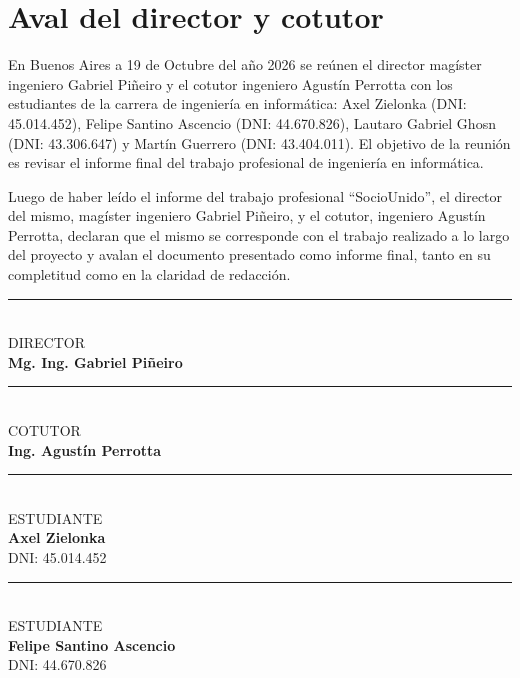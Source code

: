 \section{Aval del director y cotutor}

En Buenos Aires a 19 de Octubre del año 2026 se reúnen el director magíster ingeniero Gabriel Piñeiro y el cotutor ingeniero Agustín Perrotta con los estudiantes de la carrera de ingeniería en informática: Axel Zielonka (DNI: 45.014.452), Felipe Santino Ascencio (DNI: 44.670.826), Lautaro Gabriel Ghosn (DNI: 43.306.647) y Martín Guerrero (DNI: 43.404.011). El objetivo de la reunión es revisar el informe final del trabajo profesional de ingeniería en informática.

\vspace{1cm}

Luego de haber leído el informe del trabajo profesional ``SocioUnido'', el director del mismo, magíster ingeniero Gabriel Piñeiro, y el cotutor, ingeniero Agustín Perrotta, declaran que el mismo se corresponde con el trabajo realizado a lo largo del proyecto y avalan el documento presentado como informe final, tanto en su completitud como en la claridad de redacción.

\vspace{3.5cm}

\noindent
\begin{minipage}[t]{0.45\textwidth}
\centering
\rule{6.5cm}{0.4pt} \\
DIRECTOR \\
\textbf{Mg. Ing. Gabriel Piñeiro} \\
{\small }
\end{minipage}
\hfill
\begin{minipage}[t]{0.45\textwidth}
\centering
\rule{6.5cm}{0.4pt} \\
COTUTOR \\
\textbf{Ing. Agustín Perrotta} \\
{\small }
\end{minipage}

\vspace{4cm}

\noindent
\begin{minipage}[t]{0.45\textwidth}
\centering
\rule{6.5cm}{0.4pt} \\
ESTUDIANTE \\
\textbf{Axel Zielonka} \\
{\small DNI: 45.014.452}
\end{minipage}
\hfill
\begin{minipage}[t]{0.45\textwidth}
\centering
\rule{6.5cm}{0.4pt} \\
ESTUDIANTE \\
\textbf{Felipe Santino Ascencio} \\
{\small DNI: 44.670.826}
\end{minipage}

